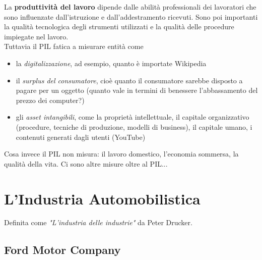 \documentclass[a4paper,portrait,12pt]{article}
\theoremstyle{definition}
\begin{document}
La \textbf{produttività del lavoro} dipende dalle abilità professionali dei lavoratori che sono influenzate dall'istruzione e dall'addestramento ricevuti.
Sono poi importanti la qualità tecnologica degli strumenti utilizzati e la qualità delle procedure impiegate nel lavoro.\\

Tuttavia il PIL fatica a misurare entità come
\begin{itemize}
\item la \emph{digitalizzazione}, ad esempio, quanto è importate Wikipedia
\item il \emph{surplus del consumatore}, cioè quanto il consumatore sarebbe disposto a pagare per un oggetto (quanto vale in termini di benessere l'abbassamento del prezzo dei computer?)
\item gli \emph{asset intangibili}, come la proprietà intellettuale, il capitale organizzativo (procedure, tecniche di produzione, modelli di business), il capitale umano, i contenuti generati dagli utenti (YouTube)
\end{itemize}

Cosa invece il PIL non misura: il lavoro domestico, l'economia sommersa, la qualità della vita.
Ci sono altre misure oltre al PIL...



\newpage
\section{L'Industria Automobilistica}



Definita come \emph{"L'industria delle industrie"} da Peter Drucker.


\subsection{Ford Motor Company}
\end{document}
